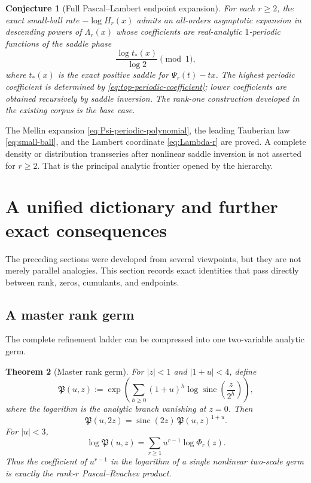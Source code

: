 \documentclass[11pt,a4paper]{article}
\theoremstyle{frontier}
\newtheorem{theorem}{Theorem}[section]
\newtheorem{conjecture}[theorem]{Conjecture}
\theoremstyle{definition}
\newcommand{\sinc}{\operatorname{sinc}}
\begin{document}
\begin{conjecture}[Full Pascal--Lambert endpoint expansion]\label{conj:full-endpoint}
For each $r\ge2$, the exact small-ball rate $-\log H_r(x)$ admits an all-orders asymptotic expansion in descending powers of $\Lambda_r(x)$ whose coefficients are real-analytic $1$-periodic functions of the saddle phase
\[
  \frac{\log t_*(x)}{\log2}\pmod1,
\]
where $t_*(x)$ is the exact positive saddle for $\Psi_r(t)-tx$.  The highest periodic coefficient is determined by \eqref{eq:top-periodic-coefficient}; lower coefficients are obtained recursively by saddle inversion.  The rank-one construction developed in the existing corpus is the base case.
\end{conjecture}

\begin{cautionbox}
The Mellin expansion \eqref{eq:Psi-periodic-polynomial}, the leading Tauberian law \eqref{eq:small-ball}, and the Lambert coordinate \eqref{eq:Lambda-r} are proved.  A complete density or distribution transseries after nonlinear saddle inversion is not asserted for $r\ge2$.  That is the principal analytic frontier opened by the hierarchy.
\end{cautionbox}


\section{A unified dictionary and further exact consequences}\label{sec:synthesis}

The preceding sections were developed from several viewpoints, but they are not merely parallel analogies.  This section records exact identities that pass directly between rank, zeros, cumulants, and endpoints.

\subsection{A master rank germ}

The complete refinement ladder can be compressed into one two-variable analytic germ.

\begin{theorem}[Master rank germ]\label{thm:master-rank-germ}
For $|z|<1$ and $|1+u|<4$, define
\begin{equation}\label{eq:master-rank-germ}
 \mathfrak P(u,z):=
 \exp\!\left(
   \sum_{h\ge0}(1+u)^h
   \log\sinc\!\left(\frac z{2^h}\right)
 \right),
\end{equation}
where the logarithm is the analytic branch vanishing at $z=0$.  Then
\begin{equation}\label{eq:master-nonlinear-refinement}
 \boxed{\quad
 \mathfrak P(u,2z)=\sinc(2z)\,\mathfrak P(u,z)^{1+u}.
 \quad}
\end{equation}
For $|u|<3$,
\begin{equation}\label{eq:master-rank-coefficients}
 \log\mathfrak P(u,z)
 =\sum_{r\ge1}u^{r-1}\log\Phi_r(z).
\end{equation}
Thus the coefficient of $u^{r-1}$ in the logarithm of a single nonlinear two-scale germ is exactly the rank-$r$ Pascal--Rvachev product.
\end{theorem}
\end{document}
